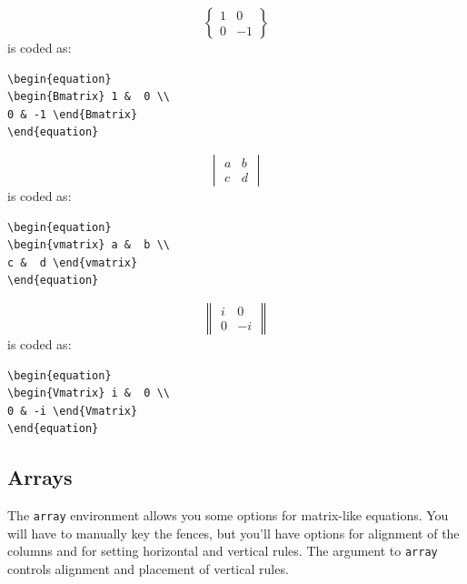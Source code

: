 \documentclass[lettersize,journal]{IEEEtran}
\begin{document}
\begin{equation}
\begin{Bmatrix} 1 &  0 \\
0 & -1 \end{Bmatrix}
\end{equation}
is coded as:
\begin{verbatim}
\begin{equation}
\begin{Bmatrix} 1 &  0 \\
0 & -1 \end{Bmatrix}
\end{equation}\end{verbatim}

\begin{equation}
\begin{vmatrix} a &  b \\
c &  d \end{vmatrix}
\end{equation}
is coded as:
\begin{verbatim}
\begin{equation}
\begin{vmatrix} a &  b \\
c &  d \end{vmatrix}
\end{equation}\end{verbatim}

\begin{equation}
\begin{Vmatrix} i &  0 \\
0 & -i \end{Vmatrix}
\end{equation}
is coded as:
\begin{verbatim}
\begin{equation}
\begin{Vmatrix} i &  0 \\
0 & -i \end{Vmatrix}
\end{equation}\end{verbatim}

\subsection{Arrays}
\noindent The {\tt{array}} environment allows you some options for matrix-like equations. You will have to manually key the fences, but you'll have options for alignment of the columns and for setting horizontal and vertical rules. The argument to {\tt{array}} controls alignment and placement of vertical rules.
\end{document}
